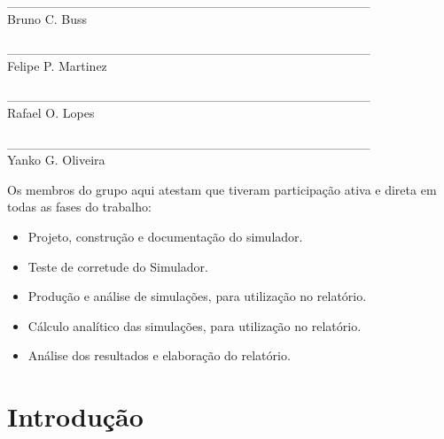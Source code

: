 \documentclass[a4paper,10pt]{article}
\begin{document}
\pagebreak


\begin{center}
\vspace{1cm}

\large

\_\_\_\_\_\_\_\_\_\_\_\_\_\_\_\_\_\_\_\_\_\_\_\_\_\_\_\_\_\_\_\_\_\_\_\_\_\_\_\\
Bruno C. Buss

\vspace{0.5cm}

\_\_\_\_\_\_\_\_\_\_\_\_\_\_\_\_\_\_\_\_\_\_\_\_\_\_\_\_\_\_\_\_\_\_\_\_\_\_\_\\
Felipe P. Martinez

\vspace{0.5cm}

\_\_\_\_\_\_\_\_\_\_\_\_\_\_\_\_\_\_\_\_\_\_\_\_\_\_\_\_\_\_\_\_\_\_\_\_\_\_\_\\
Rafael O. Lopes

\vspace{0.5cm}

\_\_\_\_\_\_\_\_\_\_\_\_\_\_\_\_\_\_\_\_\_\_\_\_\_\_\_\_\_\_\_\_\_\_\_\_\_\_\_\\
Yanko G. Oliveira

\vspace{0.5cm}

\vspace{1cm}

\normalsize
\end{center}

Os membros do grupo aqui atestam que tiveram participação ativa e direta em todas as fases do trabalho:
\begin{itemize}
	\item Projeto, construção e documentação do simulador.
	\item Teste de corretude do Simulador.
	\item Produção e análise de simulações, para utilização no relatório.
	\item Cálculo analítico das simulações, para utilização no relatório.
	\item Análise dos resultados e elaboração do relatório.
\end{itemize}


\pagebreak



\tableofcontents
\pagebreak

\listoffigures
\pagebreak

\section{Introdução}
\end{document}
